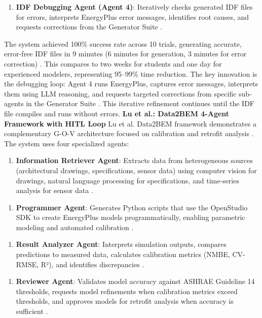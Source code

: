 \documentclass[12pt,a4paper]{article}
\begin{document}
\begin{enumerate}[resume]
  \item \textbf{IDF Debugging Agent (Agent 4)}: Iteratively checks generated IDF files for errors, interprets EnergyPlus error messages, identifies root causes, and requests corrections from the Generator Suite \cite{ref123}.
\end{enumerate}
The system achieved 100\% success rate across 10 trials, generating accurate, error-free IDF files in 9 minutes (6 minutes for generation, 3 minutes for error correction) \cite{ref123}. This compares to two weeks for students and one day for experienced modelers, representing 95--99\% time reduction. The key innovation is the debugging loop: Agent 4 runs EnergyPlus, captures error messages, interprets them using LLM reasoning, and requests targeted corrections from specific sub-agents in the Generator Suite \cite{ref123}. This iterative refinement continues until the IDF file compiles and runs without errors.
\textbf{Lu et al.: Data2BEM 4-Agent Framework with HITL Loop}
Lu et al. Data2BEM framework demonstrates a complementary G-O-V architecture focused on calibration and retrofit analysis \cite{ref36}. The system uses four specialized agents:
\begin{enumerate}
  \item \textbf{Information Retriever Agent}: Extracts data from heterogeneous sources (architectural drawings, specifications, sensor data) using computer vision for drawings, natural language processing for specifications, and time-series analysis for sensor data \cite{ref36}.
\end{enumerate}
\begin{enumerate}[resume]
  \item \textbf{Programmer Agent}: Generates Python scripts that use the OpenStudio SDK to create EnergyPlus models programmatically, enabling parametric modeling and automated calibration \cite{ref36}.
\end{enumerate}
\begin{enumerate}[resume]
  \item \textbf{Result Analyzer Agent}: Interprets simulation outputs, compares predictions to measured data, calculates calibration metrics (NMBE, CV-RMSE, R²), and identifies discrepancies \cite{ref36}.
\end{enumerate}
\begin{enumerate}[resume]
  \item \textbf{Reviewer Agent}: Validates model accuracy against ASHRAE Guideline 14 thresholds, requests model refinements when calibration metrics exceed thresholds, and approves models for retrofit analysis when accuracy is sufficient \cite{ref36}.
\end{enumerate}
\end{document}
